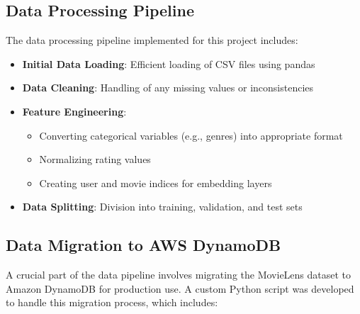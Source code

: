 \documentclass[12pt]{article}
\begin{document}
\subsection{Data Processing Pipeline}
The data processing pipeline implemented for this project includes:
\begin{itemize}
    \item \textbf{Initial Data Loading}: Efficient loading of CSV files using pandas
    \item \textbf{Data Cleaning}: Handling of any missing values or inconsistencies
    \item \textbf{Feature Engineering}: 
    \begin{itemize}
        \item Converting categorical variables (e.g., genres) into appropriate format
        \item Normalizing rating values
        \item Creating user and movie indices for embedding layers
    \end{itemize}
    \item \textbf{Data Splitting}: Division into training, validation, and test sets
\end{itemize}

\subsection{Data Migration to AWS DynamoDB}
A crucial part of the data pipeline involves migrating the MovieLens dataset to Amazon DynamoDB for production use. A custom Python script was developed to handle this migration process, which includes:
\end{document}
